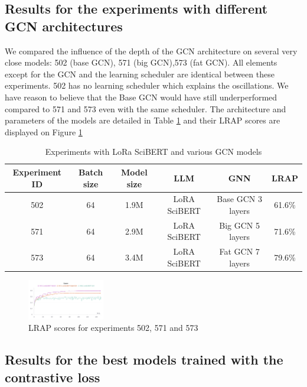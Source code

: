 \subsection{Results for the experiments with different GCN architectures }
\label{sec:gcn}
We compared the influence of the depth of the GCN architecture on several very close models: 502 (base GCN), 571 (big GCN),573 (fat GCN). All elements except for the GCN and the learning scheduler are identical between these experiments. 502 has no learning scheduler which explains the oscillations. We have reason to believe that the Base GCN would have still underperformed compared to 571 and 573 even with the same scheduler. The architecture and parameters of the models are detailed in Table \ref{tab:GCN} and their LRAP scores are displayed on Figure \ref{gcn_fig}
\begin{table}[!]
    \centering
    \begin{tabular}{|c|c|c|c|c|c|}
    \hline
    \textbf{Experiment ID} &\textbf{Batch size}& \textbf{Model size} & \textbf{LLM} & \textbf{GNN} & \textbf{LRAP} \\ \hline
    502         &  64    &1.9M & LoRA SciBERT  & Base GCN 3 layers & 61.6\%      \\ \hline
     571         &  64    &2.9M & LoRA SciBERT  & Big GCN 5 layers  & 71.6\%      \\ \hline
     573        &  64    &3.4M & LoRA SciBERT  & Fat GCN 7 layers  & 79.6\%      \\ \hline
    \end{tabular}
    \caption{Experiments with LoRa SciBERT and various GCN models}
    \label{tab:GCN}
\end{table}
\begin{figure}
\includegraphics[width=0.3\textwidth]{figures/gcn.png}
\caption{LRAP scores for experiments 502, 571 and 573}
\label{gcn_fig}
\end{figure}

\subsection{Results for the best models trained with the contrastive loss}
\label{sec:best_old}

